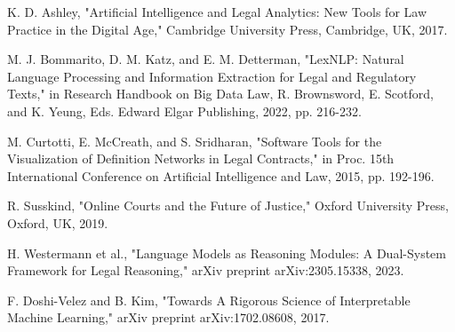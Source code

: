 \documentclass[conference]{IEEEtran}
\begin{document}
\begin{thebibliography}{00}
 K. D. Ashley, "Artificial Intelligence and Legal Analytics: New Tools for Law Practice in the Digital Age," Cambridge University Press, Cambridge, UK, 2017.

 M. J. Bommarito, D. M. Katz, and E. M. Detterman, "LexNLP: Natural Language Processing and Information Extraction for Legal and Regulatory Texts," in Research Handbook on Big Data Law, R. Brownsword, E. Scotford, and K. Yeung, Eds. Edward Elgar Publishing, 2022, pp. 216-232.

 M. Curtotti, E. McCreath, and S. Sridharan, "Software Tools for the Visualization of Definition Networks in Legal Contracts," in Proc. 15th International Conference on Artificial Intelligence and Law, 2015, pp. 192-196.

 R. Susskind, "Online Courts and the Future of Justice," Oxford University Press, Oxford, UK, 2019.

 H. Westermann et al., "Language Models as Reasoning Modules: A Dual-System Framework for Legal Reasoning," arXiv preprint arXiv:2305.15338, 2023.

 F. Doshi-Velez and B. Kim, "Towards A Rigorous Science of Interpretable Machine Learning," arXiv preprint arXiv:1702.08608, 2017.
\end{thebibliography}
\end{document}
